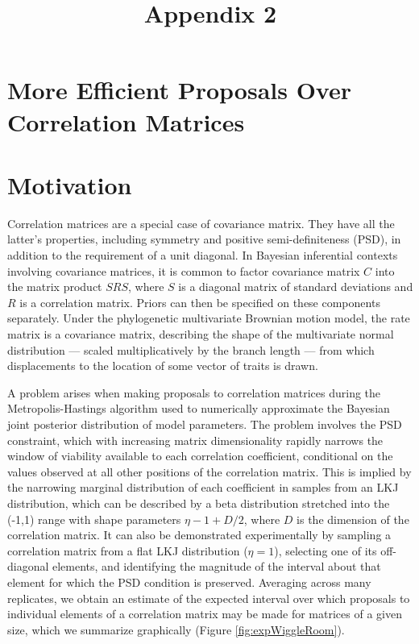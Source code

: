 \documentclass[10pt]{article}
\title{\vspace{-2.5cm}Appendix 2}
\author{}
\date{}
\begin{document}
\maketitle{}

\section*{More Efficient Proposals Over Correlation Matrices}

\section{Motivation}

Correlation matrices are a special case of covariance matrix. They have all the latter's properties, including symmetry and positive semi-definiteness (PSD), in addition to the requirement of a unit diagonal. In Bayesian inferential contexts involving covariance matrices, it is common to factor covariance matrix $C$ into the matrix product $SRS$, where $S$ is a diagonal matrix of standard deviations and $R$ is a correlation matrix. Priors can then be specified on these components separately. Under the phylogenetic multivariate Brownian motion model, the rate matrix is a covariance matrix, describing the shape of the multivariate normal distribution --- scaled multiplicatively by the branch length --- from which displacements to the location of some vector of traits is drawn.

A problem arises when making proposals to correlation matrices during the Metropolis-Hastings algorithm \citep{hastingsMonteCarloSampling1970} used to numerically approximate the Bayesian joint posterior distribution of model parameters. The problem involves the PSD constraint, which with increasing matrix dimensionality rapidly narrows the window of viability available to each correlation coefficient, conditional on the values observed at all other positions of the correlation matrix. This is implied by the narrowing marginal distribution of each coefficient in samples from an LKJ distribution, which can be described by a beta distribution stretched into the (-1,1) range with shape parameters $\eta -1 + D/2$, where $D$ is the dimension of the correlation matrix. It can also be demonstrated experimentally by sampling a correlation matrix from a flat LKJ distribution ($\eta = 1$), selecting one of its off-diagonal elements, and identifying the magnitude of the interval about that element for which the PSD condition is preserved. Averaging across many replicates, we obtain an estimate of the expected interval over which proposals to individual elements of a correlation matrix may be made for matrices of a given size, which we summarize graphically (Figure \ref{fig:expWiggleRoom}).
\end{document}
